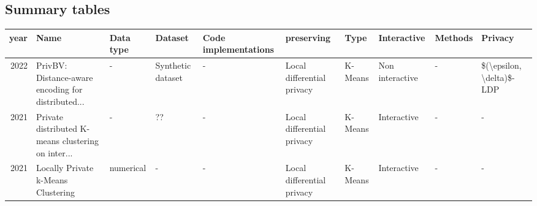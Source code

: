 \subsection{Summary tables}
\begin{landscape}
  \begin{table}[ht]
    \centering
    \begin{adjustbox}{width=1.8\textwidth}
      \begin{tabular}{rlllllllll}
        \toprule
        year              & Name                                                                                                          & Data type                            & Dataset                                            & Code implementations                    & preserving                 & Type                & Interactive     & Methods                                   & Privacy                                                                                                       \\
        \midrule
        2022              & PrivBV: Distance-aware encoding for distributed...                                                            & -                                    & Synthetic dataset                                  & -                                       & Local differential privacy & K-Means             & Non interactive & -                                         & \$(\textbackslash epsilon, \textbackslash delta)\$-LDP                                                        \\
        2021              & Private distributed K-means clustering on inter...                                                            & -                                    & ??                                                 & -                                       & Local differential privacy & K-Means             & Interactive     & -                                         & -                                                                                                             \\
        2021              & Locally Private k-Means Clustering                                                                            & numerical                            & -                                                  & -                                       & Local differential privacy & K-Means             & Interactive     & -                                         & -                                                                                                             \\

\end{tabular}
\end{adjustbox}
\end{table}
\end{landscape}
